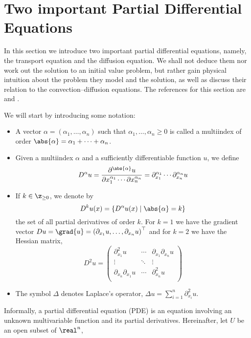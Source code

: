 
\section{Two important Partial Differential Equations}

In this section we introduce two important partial differential equations,
namely, the transport equation and the diffusion equation. We shall not deduce
them nor work out the solution to an initial value problem, but rather gain
physical intuition about the problem they model and the solution, as well as
discuss their relation to the convection--diffusion equations. The references
for this section are \cite{salsa2009pde} and \cite{evans1998pde}.

We will start by introducing some notation:
\begin{itemize}[topsep=0pt]
    \item A vector $\alpha = (\alpha_1, \ldots, \alpha_n)$ such that $\alpha_1,
    \ldots, \alpha_n \geq 0$ is called a multiindex of order $\abs{\alpha} =
    \alpha_1 + \cdots + \alpha_n$.
    \item Given a multiindex $\alpha$ and a sufficiently differentiable function
    $u$, we define
    \begin{equation}
        D^\alpha u = 
        \frac{\partial^{\abs{\alpha}} u}{\partial x_1^{\alpha_1} \cdots \partial x_n^{\alpha_n}} =
        \partial_{x_1}^{\alpha_1} \cdots \partial_{x_n}^{\alpha_n} u
    \end{equation}
    \item If $k \in \z_{\geq 0}$, we denote by
    \begin{equation}
        D^k u(x) = \left\{ D^{\alpha} u(x) \mid \abs{\alpha} = k \right\}
    \end{equation}
    the set of all partial derivatives of order $k$. For $k = 1$ we have the
    gradient vector $D u = \grad{u} = \left(\partial_{x_1} u, \ldots,
    \partial_{x_n} u \right)^\top$ and for $k = 2$ we have the Hessian matrix,
    \begin{equation}
        D^2 u = 
        \begin{pmatrix}
            \partial_{x_1}^2 u & \cdots & \partial_{x_1} \partial_{x_n} u \\
            \vdots & \ddots & \vdots \\
            \partial_{x_n} \partial_{x_1} u & \cdots & \partial_{x_n}^2 u \\
        \end{pmatrix}
    \end{equation}
    \item The symbol $\Delta$ denotes Laplace's operator, \ie $\Delta u =
    \sum_{i=1}^n \partial_{x_i}^2 u$.
\end{itemize}

Informally, a partial differential equation (PDE) is an equation involving an
unknown multivariable function and its partial derivatives. Hereinafter, let $U$
be an open subset of $\real^n$,  








